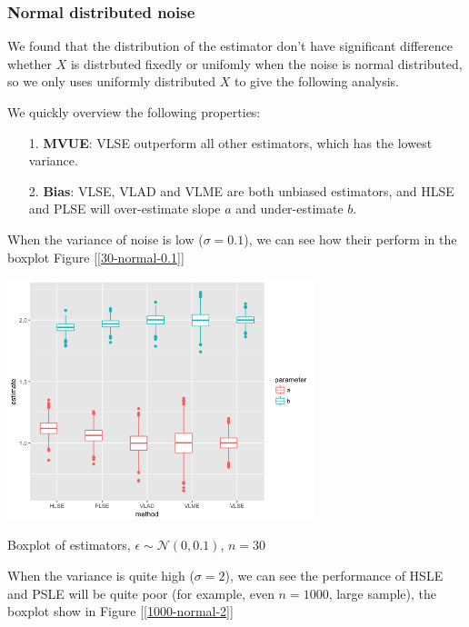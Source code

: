 \documentclass[twoside]{article}
\begin{document}
\subsubsection*{Normal distributed noise}

We found that the distribution of the estimator don't have significant difference whether $X$ is distrbuted fixedly or unifomly when the noise is normal distributed, so we only uses uniformly distributed $X$ to give the following analysis.

We quickly overview the following properties:

\begin{itemize}
  \item [1.] \textbf{MVUE}: VLSE outperform all other estimators, which has the lowest variance.
  \item [2.] \textbf{Bias}: VLSE, VLAD and VLME are both unbiased estimators, and HLSE and PLSE will over-estimate slope $a$ and under-estimate $b$.
\end{itemize}

When the variance of noise is low ($\sigma=0.1$), we can see how their perform in the boxplot Figure [\ref{30-normal-0.1}]

\begin{center}
\makeatletter
\def\@captype{figure}
\makeatother
\includegraphics [height=7cm]{code/n=30,uniform,normal_0.1.png}
\caption{Boxplot of estimators, $\epsilon \sim \mathcal{N}(0,0.1)$, $n=30$}
\label{30-normal-0.1}
\end{center}

When the variance is quite high ($\sigma=2$), we can see the performance of HSLE and PSLE will be quite poor (for example, even $n=1000$, large sample), the boxplot show in Figure [\ref{1000-normal-2}] 
\end{document}
